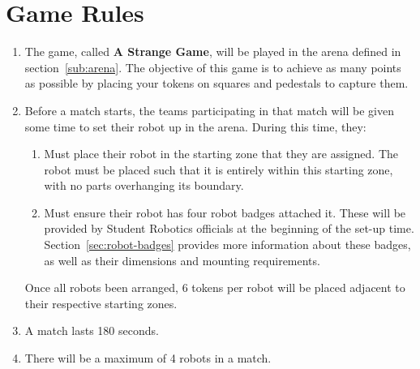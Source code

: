 \section {Game Rules}
\label{game-rules}

\begin{enumerate}
\item The game, called \textbf{A Strange Game}, will be played in the arena defined in section~\ref{sub:arena}.
      The objective of this game is to achieve as many points as possible by placing your tokens on squares and pedestals to capture them.

\item Before a match starts, the teams participating in that match will be given some time to set their robot up in the arena.
      During this time, they:
\begin{enumerate}
  \item Must place their robot in the starting zone that they are assigned.
        The robot must be placed such that it is entirely within this starting zone, with no parts overhanging its boundary.

  \item Must ensure their robot has four robot badges attached it.
        These will be provided by Student Robotics officials at the beginning of the set-up time.
        Section~\ref{sec:robot-badges} provides more information about these badges, as well as their dimensions and mounting requirements.
\end{enumerate}
      Once all robots been arranged, 6 tokens per robot will be placed adjacent to their respective starting zones.

\item A match lasts 180 seconds.

\item There will be a maximum of 4 robots in a match.


\end{enumerate}
